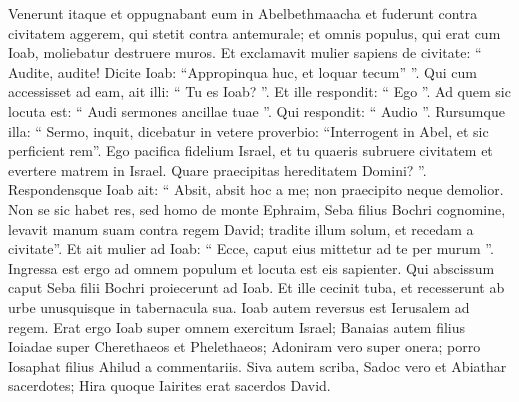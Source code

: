 \begin{biblechapter}
\begin{biblechapter}
\begin{biblechapter}
\begin{biblechapter}
\begin{biblechapter}
\begin{biblechapter}
\begin{biblechapter}
\begin{biblechapter}
\begin{biblechapter}
\begin{biblechapter}
\begin{biblechapter}
\begin{biblechapter}
\begin{biblechapter}
\begin{biblechapter}
\begin{biblechapter}
\begin{biblechapter}
\begin{biblechapter}
\begin{biblechapter}
\begin{biblechapter}
\begin{biblechapter}
\verse Venerunt itaque et oppugnabant eum in Abelbethmaacha et fuderunt contra civitatem aggerem, qui stetit contra antemurale; et omnis populus, qui erat cum Ioab, moliebatur destruere muros.
 \verse Et exclamavit mulier sapiens de civitate: “ Audite, audite! Dicite Ioab: “Appropinqua huc, et loquar tecum” ”. 
\verse Qui cum accessisset ad eam, ait illi: “ Tu es Ioab? ”. Et ille respondit: “ Ego ”. Ad quem sic locuta est: “ Audi sermones ancillae tuae ”. Qui respondit: “ Audio ”. 
\verse Rursumque illa: “ Sermo, inquit, dicebatur in vetere proverbio: “Interrogent in Abel, et sic perficient rem”. 
\verse Ego pacifica fidelium Israel, et tu quaeris subruere civitatem et evertere matrem in Israel. Quare praecipitas hereditatem Domini? ”. 
 \verse Respondensque Ioab ait: “ Absit, absit hoc a me; non praecipito neque demolior. 
\verse Non se sic habet res, sed homo de monte Ephraim, Seba filius Bochri cognomine, levavit manum suam contra regem David; tradite illum solum, et recedam a civitate”. Et ait mulier ad Ioab: “ Ecce, caput eius mittetur ad te per murum ”. 
\verse Ingressa est ergo ad omnem populum et locuta est eis sapienter. Qui abscissum caput Seba filii Bochri proiecerunt ad Ioab. Et ille cecinit tuba, et recesserunt ab urbe unusquisque in tabernacula sua. Ioab autem reversus est Ierusalem ad regem.
 \verse Erat ergo Ioab super omnem exercitum Israel; Banaias autem filius Ioiadae super Cherethaeos et Phelethaeos; 
\verse Adoniram vero super onera; porro Iosaphat filius Ahilud a commentariis. 
\verse Siva autem scriba, Sadoc vero et Abiathar sacerdotes; 
\verse Hira quoque Iairites erat sacerdos David.
 

\end{biblechapter}
\end{biblechapter}
\end{biblechapter}
\end{biblechapter}
\end{biblechapter}
\end{biblechapter}
\end{biblechapter}
\end{biblechapter}
\end{biblechapter}
\end{biblechapter}
\end{biblechapter}
\end{biblechapter}
\end{biblechapter}
\end{biblechapter}
\end{biblechapter}
\end{biblechapter}
\end{biblechapter}
\end{biblechapter}
\end{biblechapter}
\end{biblechapter}
